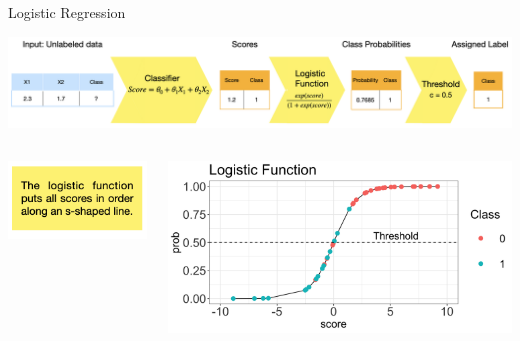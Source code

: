 \documentclass[11pt,compress,t,notes=noshow, xcolor=table]{beamer}
\begin{document}
\begin{vbframe}{Logistic Regression}
\begin{center}
  \includegraphics[width = 1\textwidth]{slides/supervised-classification/figure_man/nutshell-classif-logistic-regression.png}
\end{center}
\begin{columns}
\begin{column}{0.35\textwidth} 
\begin{center}
\includegraphics[width=\textwidth]{slides/supervised-classification/figure_man/nutshell-classification-text-box-logisticreg.png}
\end{center}
\end{column}
\begin{column}{0.55\textwidth} 
\begin{center}
  \includegraphics[width=1\textwidth]{slides/supervised-classification/figure/nutshell_classif_logistic_function.png}
\end{center}
\end{column}
\end{columns}



\end{vbframe}
\end{document}
